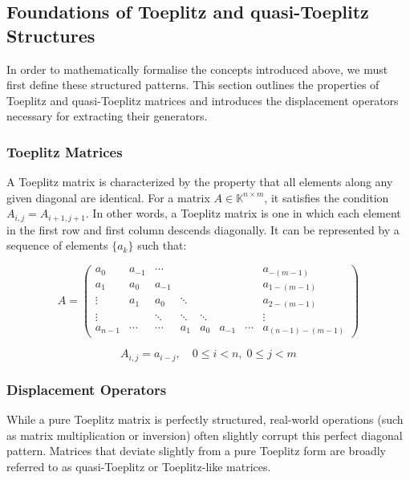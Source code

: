 \subsection{Foundations of Toeplitz and quasi-Toeplitz Structures}

In order to mathematically formalise the concepts introduced above,
we must first define these structured patterns.
This section outlines the properties of Toeplitz and quasi-Toeplitz matrices
and introduces the displacement operators necessary for extracting
their generators.

\subsubsection{Toeplitz Matrices}

A Toeplitz matrix is characterized by the property that all elements
along any given diagonal are identical.
For a matrix $A \in \mathbb{K}^{n \times m}$, it satisfies the
condition $A_{i,j} = A_{i+1, j+1}$.
In other words, a Toeplitz matrix is one in which each element in the
first row and first column descends diagonally.
It can be represented by a sequence of elements $\{a_k\}$ such that:

\begin{equation*}
  A =
  \begin{pmatrix}
    a_0     & a_{-1} & \cdots   &        &        &       & & a_{-(m-1)} \\
    a_1     & a_0    & a_{-1}   &        &        &       & &a_{1-(m-1)} \\
    \vdots  & a_1    & a_0      & \ddots &        &       & & a_{2-(m-1)} \\
    \vdots  &        & \ddots   & \ddots & \ddots &       & & \vdots     \\
    a_{n-1} & \cdots & \cdots   & a_1    & a_0    & a_{-1}&\cdots&
    a_{(n-1)-(m-1)}
  \end{pmatrix}
\end{equation*}

\[
  A_{i,j} = a_{i-j}, \quad 0 \le i < n,\; 0 \le j < m
\]

\subsubsection{Displacement Operators}

While a pure Toeplitz matrix is perfectly structured, real-world
operations (such as matrix multiplication or inversion) often
slightly corrupt this perfect diagonal pattern. Matrices that deviate
slightly from a pure Toeplitz form are broadly referred to as
quasi-Toeplitz or Toeplitz-like matrices.

